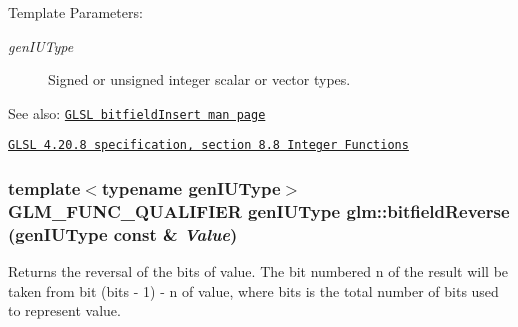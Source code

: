 \begin{Desc}
\item[Template Parameters:]
\begin{description}
\item[{\em genIUType}]Signed or unsigned integer scalar or vector types.\end{description}
\end{Desc}
\begin{Desc}
\item[See also:]\href{http://www.opengl.org/sdk/docs/manglsl/xhtml/bitfieldInsert.xml}{\tt GLSL bitfieldInsert man page} 

\href{http://www.opengl.org/registry/doc/GLSLangSpec.4.20.8.pdf}{\tt GLSL 4.20.8 specification, section 8.8 Integer Functions} \end{Desc}
\hypertarget{group__core__func__integer_ge55354ee3125593fc17f4cff052e6a10}{
\subsubsection[bitfieldReverse]{\setlength{\rightskip}{0pt plus 5cm}template$<$typename genIUType$>$ GLM\_\-FUNC\_\-QUALIFIER genIUType glm::bitfieldReverse (genIUType const \& {\em Value})}}
\label{group__core__func__integer_ge55354ee3125593fc17f4cff052e6a10}


Returns the reversal of the bits of value. The bit numbered n of the result will be taken from bit (bits - 1) - n of value, where bits is the total number of bits used to represent value.

